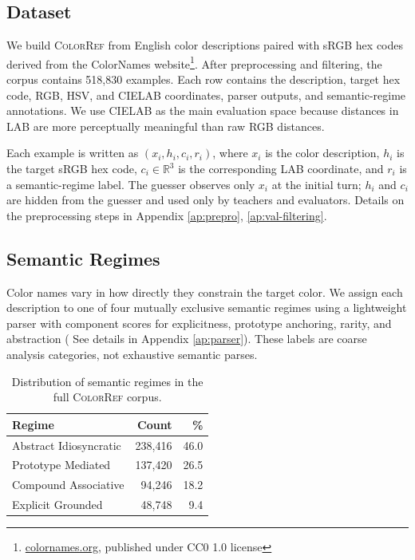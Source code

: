 \documentclass[11pt]{article}
\begin{document}
\subsection{Dataset}
\label{sec:dataset}

We build \textsc{ColorRef} from English color descriptions paired with sRGB
hex codes derived from the ColorNames website\footnote{\url{colornames.org}, published  under CC0 1.0 license}.
After preprocessing and filtering, the corpus contains 518{,}830 examples.
Each row contains the description, target hex code, RGB, HSV, and CIELAB
coordinates, parser outputs, and semantic-regime annotations. We use CIELAB
as the main evaluation space because distances in LAB are more perceptually
meaningful than raw RGB distances.

Each example is written as $(x_i,h_i,c_i,r_i)$, where $x_i$ is the color
description, $h_i$ is the target sRGB hex code, $c_i \in \mathbb{R}^3$ is
the corresponding LAB coordinate, and $r_i$ is a semantic-regime label. The
guesser observes only $x_i$ at the initial turn; $h_i$ and $c_i$ are hidden
from the guesser and used only by teachers and evaluators. Details on the preprocessing steps in Appendix \ref{ap:prepro}, \ref{ap:val-filtering}.

\subsection{Semantic Regimes}
\label{sec:regimes}

Color names vary in how directly they constrain the target color. We assign
each description to one of four mutually exclusive semantic regimes using a
lightweight parser with component scores for explicitness, prototype
anchoring, rarity, and abstraction ( See details in Appendix \ref{ap:parser}). These labels are coarse analysis
categories, not exhaustive semantic parses.

\begin{table}[t]
\centering
\small
\begin{tabular}{@{}lrr@{}}
\toprule
\textbf{Regime} & \textbf{Count} & \% \\
\midrule
Abstract Idiosyncratic & 238{,}416 & 46.0 \\
Prototype Mediated & 137{,}420 & 26.5 \\
Compound Associative & 94{,}246 & 18.2 \\
Explicit Grounded & 48{,}748 & 9.4 \\
\bottomrule
\end{tabular}
\caption{Distribution of semantic regimes in the full
\textsc{ColorRef} corpus.}
\label{tab:regime_distribution}
\end{table}
\end{document}
